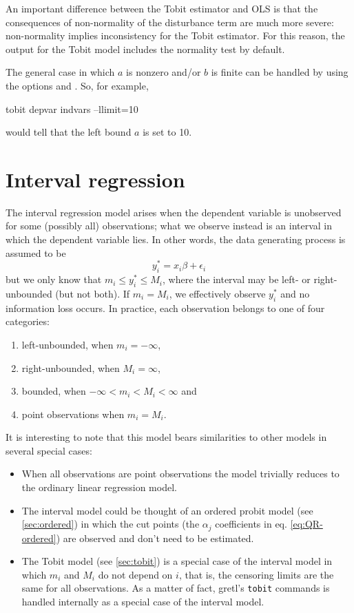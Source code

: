 An important difference between the Tobit estimator and OLS is that
the consequences of non-normality of the disturbance term are much
more severe: non-normality implies inconsistency for the Tobit
estimator. For this reason, the output for the Tobit model includes
the \cite{chesher-irish87} normality test by default.

The general case in which $a$ is nonzero and/or $b$ is finite can be
handled by using the options  and . So,
for example,
\begin{code}
tobit depvar indvars --llimit=10
\end{code}
would tell  that the left bound $a$ is set to 10.

\section{Interval regression}
\label{sec:intreg}

The interval regression model arises when the dependent variable is
unobserved for some (possibly all) observations; what we observe
instead is an interval in which the dependent variable lies.  In other
words, the data generating process is assumed to be
\[
  y^*_i = x_i \beta + \epsilon_i
\] 
but we only know that $m_i \le y^*_i \le M_i$, where the interval may
be left- or right-unbounded (but not both). If $m_i = M_i$, we
effectively observe $y^*_i$ and no information loss occurs. In
practice, each observation belongs to one of four categories:
\begin{enumerate}
\item left-unbounded, when $m_i = -\infty$,
\item right-unbounded, when $M_i = \infty$,
\item bounded, when $-\infty < m_i < M_i <\infty$ and
\item point observations when $m_i = M_i$.
\end{enumerate}

It is interesting to note that this model bears similarities to other
models in several special cases:
\begin{itemize}
\item When all observations are point observations the model trivially
  reduces to the ordinary linear regression model.
\item The interval model could be thought of an ordered probit model
  (see \ref{sec:ordered}) in which the cut points (the $\alpha_j$
  coefficients in eq. \ref{eq:QR-ordered}) are observed and don't need
  to be estimated.
\item The Tobit model (see \ref{sec:tobit}) is a special case of the
  interval model in which $m_i$ and $M_i$ do not depend on $i$, that
  is, the censoring limits are the same for all observations. As a
  matter of fact, gretl's \texttt{tobit} commands is handled
  internally as a special case of the interval model.
\end{itemize}

